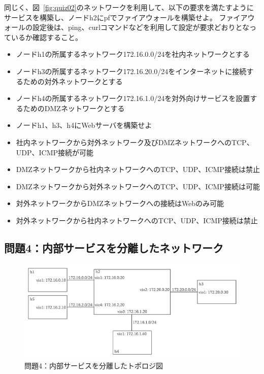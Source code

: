 同じく、図~\ref{fig:quiz02}のネットワークを利用して、以下の要求を満たすように
サービスを構築し、ノードh2にpfでファイアウォールを構築せよ。
ファイアウォールの設定後は、ping、curlコマンドなどを利用して設定が要求どおりとなっているか確認すること。

\begin{itemize}
    \item ノードh1の所属するネットワーク172.16.0.0/24を社内ネットワークとする
    \item ノードh3の所属するネットワーク172.16.20.0/24をインターネットに接続するための対外ネットワークとする
    \item ノードh4の所属するネットワーク172.16.1.0/24を対外向けサービスを設置するためのDMZネットワークとする
    \item ノードh1、h3、h4にWebサーバを構築せよ
    \item 社内ネットワークから対外ネットワーク及びDMZネットワークへのTCP、UDP、ICMP接続が可能
    \item DMZネットワークから社内ネットワークへのTCP、UDP、ICMP接続は禁止
    \item DMZネットワークから対外ネットワークへのTCP、UDP、ICMP接続は可能
    \item 対外ネットワークからDMZネットワークへの接続はWebのみ可能
    \item 対外ネットワークから社内ネットワークへのTCP、UDP、ICMP接続は禁止
\end{itemize}

\subsection{問題4：内部サービスを分離したネットワーク}

\begin{figure}
    \centering
    \includegraphics[width=15cm,pagebox=artbox]{figs/quiz04.pdf}
    \caption{問題4：内部サービスを分離したトポロジ図} \label{fig:quiz04}
\end{figure}

